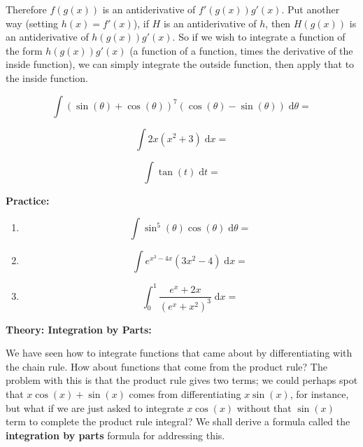 \documentclass{article}
\newcommand{\diff}{\;\mathrm{d}}
\begin{document}
Therefore $f(g(x))$ is an antiderivative of $f'(g(x))g'(x)$. Put another way (setting $h(x)=f'(x)$), if $H$ is an antiderivative of $h$, then $H(g(x))$ is an antiderivative of $h(g(x))g'(x)$. So if we wish to integrate a function of the form $h(g(x))g'(x)$ (a function of a function, times the derivative of the inside function), we can simply integrate the outside function, then apply that to the inside function.\bigskip

\[\int (\sin(\theta)+\cos(\theta))^7(\cos(\theta)-\sin(\theta))\diff \theta=\]

\vfill


\[\int 2x(x^2+3)\diff x=\]

\vfill

\[\int \tan(t)\diff t=\]

\vfill


\clearpage


















\textbf{Practice:}\bigskip





\begin{enumerate}
	\item
		\[\int \sin^5(\theta)\cos(\theta)\diff \theta=\]
	\item
		\[\int e^{x^3-4x}(3x^2-4)\diff x=\]
	\item
		\[\int_0^1 \frac{e^x+2x}{(e^x+x^2)^3}\diff x=\]
\end{enumerate}








\clearpage





\textbf{Theory: Integration by Parts:}\bigskip


We have seen how to integrate functions that came about by differentiating with the chain rule. How about functions that come from the product rule? The problem with this is that the product rule gives two terms; we could perhaps spot that $x\cos(x)+\sin(x)$ comes from differentiating $x\sin(x)$, for instance, but what if we are just asked to integrate $x\cos(x)$ without that $\sin(x)$ term to complete the product rule integral? We shall derive a formula called the \textbf{integration by parts} formula for addressing this.
\end{document}
